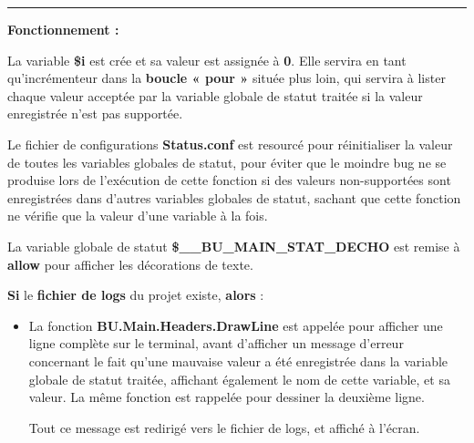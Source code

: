 \documentclass[a4paper,10pt]{article}
\begin{document}
\par\noindent\rule{\textwidth}{0.4pt}

\begin{justify}
    \textbf{Fonctionnement :}

    La variable \textbf{\color{vars}\$i} est crée et sa valeur est assignée à \textbf{0}. Elle servira en tant qu'incrémenteur dans la \textbf{\color{loop}boucle « pour »} située plus loin, qui servira à lister chaque valeur acceptée par la variable globale de statut traitée si la valeur enregistrée n'est pas supportée.
\end{justify}

\setlength{\parskip}{2em}

\begin{justify}
    Le fichier de configurations \textbf{\color{path}Status.conf} est resourcé pour réinitialiser la valeur de toutes les variables globales de statut, pour éviter que le moindre bug ne se produise lors de l'exécution de cette fonction si des valeurs non-supportées sont enregistrées dans d'autres variables globales de statut, sachant que cette fonction ne vérifie que la valeur d'une variable à la fois.
\end{justify}

\setlength{\parskip}{1em}

\begin{justify}
    La variable globale de statut \textbf{\color{vars}\$\_\_BU\_MAIN\_STAT\_DECHO} est remise à \textbf{allow} pour afficher les décorations de texte.
\end{justify}

\setlength{\parskip}{2em}

\begin{justify}
    \textbf{\color{cond}Si} le \textbf{\color{path}fichier de logs} du projet existe, \textbf{\color{cond}alors} :

    \setlength{\parskip}{1em}

    \begin{itemize}
        \item
        {
            \begin{justify}
                La fonction \textbf{\color{func}BU.Main.Headers.DrawLine} est appelée pour afficher une ligne complète sur le terminal, avant d'afficher un message d'erreur concernant le fait qu'une mauvaise valeur a été enregistrée dans la variable globale de statut traitée, affichant également le nom de cette variable, et sa valeur. La même fonction est rappelée pour dessiner la deuxième ligne.
            \end{justify}

            \setlength{\parskip}{1em}

            \begin{justify}
                Tout ce message est redirigé vers le fichier de logs, et affiché à l'écran.
            \end{justify}
        }
    \end{itemize}
\end{justify}
\end{document}
